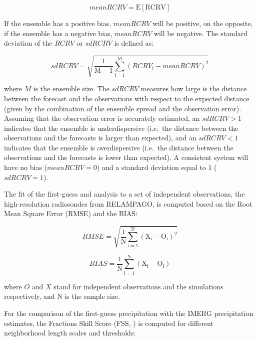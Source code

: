 \documentclass[preprint, 3p, authoryear,review, 12pt]{elsarticle} %
\begin{document}
\begin{equation}
  \mathrm{\mathit{mean RCRV} = E[RCRV]}
  \label{eq:eq3}
\end{equation}

If the ensemble has a positive bias, \(mean RCRV\) will be positive, on the opposite, if the ensemble has a negative bias, \(mean RCRV\) will be negative. The standard deviation of the \(RCRV\) or \(sd RCRV\) is defined as:

\begin{equation}
  \mathrm{\mathit{sd RCRV} = \sqrt{\frac{1}{M -1}\sum_{i=1}^{M}(\mathit{RCRV_i} - \mathit{mean RCRV})^2}}
  \label{eq:eq4}
\end{equation}

where \(M\) is the ensemble size. The \(sd RCRV\) measures how large is the distance between the forecast and the observations with respect to the expected distance (given by the combination of the ensemble spread and the observation error). Assuming that the observation error is accurately estimated, an \(sd RCRV > 1\) indicates that the ensemble is underdispersive (i.e.~the distance between the observations and the forecasts is larger than expected), and an \(sd RCRV < 1\) indicates that the ensemble is overdispersive (i.e.~the distance between the observations and the forecasts is lower than expected). A consistent system will have no bias (\(mean RCRV = 0\)) and a standard deviation equal to 1 (\(sd RCRV = 1\)).

The fit of the first-guess and analysis to a set of independent observations, the high-resolution radiosondes from RELAMPAGO, is computed based on the Root Mean Square Error (RMSE) and the BIAS:

\begin{equation}
  \mathrm{\mathit{RMSE} = \sqrt{\frac{1}{N}\sum_{i = 1}^{N} (X_i - O_i)^{2}}}
  \label{eq:eq5}
\end{equation}

\begin{equation}
  \mathrm{\mathit{BIAS} = \frac{1}{N}\sum_{i = 1}^{N} (X_i - O_i)}
  \label{eq:eq6}
\end{equation}

where \(O\) and \(X\) stand for independent observations and the simulations respectively, and N is the sample size.

For the comparison of the first-guess precipitation with the IMERG precipitation estimates, the Fractions Skill Score (FSS, \citet{roberts2008}) is computed for different neighborhood length scales and thresholds:
\end{document}

